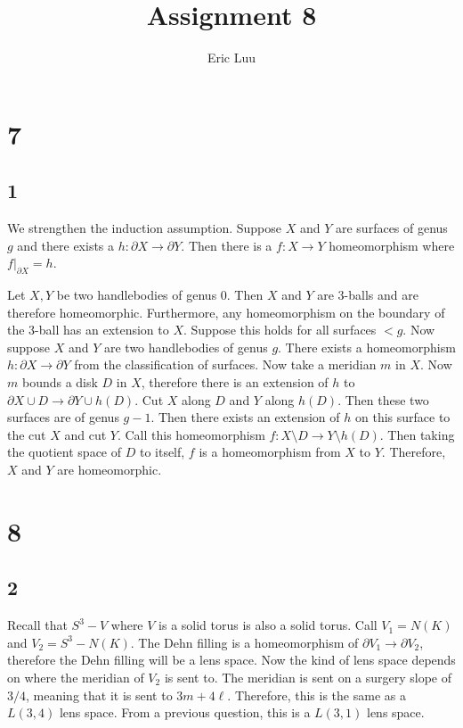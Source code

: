 \documentclass{article}
\title{Assignment 8}
\author{Eric Luu}
\theoremstyle{definition}
\numberwithin{theorem}{section}
\numberwithin{equation}{section}
\begin{document}
\section{7}

\subsection{1}
We strengthen the induction assumption. Suppose $X$ and $Y$ are surfaces of genus $g$ and there exists a $h: \partial X \rightarrow \partial Y$. Then there is a $f : X \rightarrow Y$ homeomorphism where $f|_{\partial X}= h$. 

Let $X, Y$ be two handlebodies of genus $0$. Then $X$ and $Y$ are $3$-balls and are therefore homeomorphic. Furthermore, any homeomorphism on the boundary of the $3$-ball has an extension to $X$. Suppose this holds for all surfaces $< g$. Now suppose $X$ and $Y$ are two handlebodies of genus $g$. There exists a homeomorphism $h: \partial X \rightarrow \partial Y$ from the classification of surfaces. Now take a meridian $m$ in $X$. Now $m$ bounds a disk $D$ in $X$, therefore there is an extension of $h$ to $\partial X \cup D \rightarrow \partial Y \cup h(D)$. Cut $X$ along $D$ and $Y$ along $h(D)$. Then these two surfaces are of genus $g-1$. Then there exists an extension of $h$ on this surface to the cut $X$ and cut $Y$. Call this homeomorphism $f : X \setminus D \rightarrow Y \setminus h(D)$. Then taking the quotient space of $D$ to itself, $f$ is a homeomorphism from $X$ to $Y$. Therefore, $X$ and $Y$ are homeomorphic. 


\section{8}

\subsection{2}
Recall that $S^3 - V$ where $V$ is a solid torus is also a solid torus. Call $V_1 = N(K)$ and $V_2 = S^3 - N(K)$. The Dehn filling is a homeomorphism of $\partial V_1 \rightarrow \partial V_2$, therefore the Dehn filling will be a lens space. Now the kind of lens space depends on where the meridian of $V_2$ is sent to. The meridian is sent on a surgery slope of $3/4$, meaning that it is sent to $3m + 4 \ell$. Therefore, this is the same as a $L(3,4)$ lens space. From a previous question, this is a $L(3, 1)$ lens space. 
\end{document}
